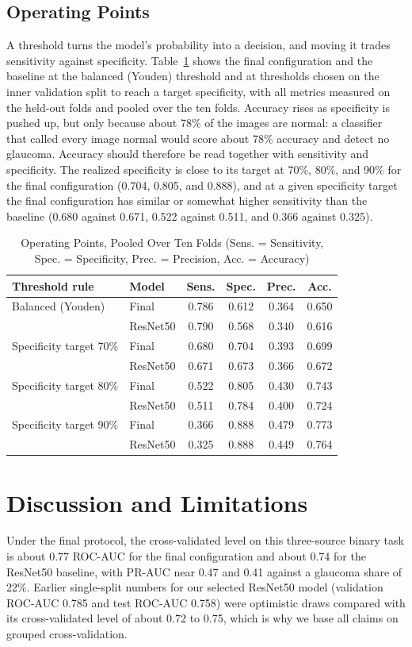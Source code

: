 \subsection{Operating Points}
A threshold turns the model's probability into a decision, and moving it trades sensitivity against specificity. Table~\ref{tab:op} shows the final configuration and the baseline at the balanced (Youden) threshold and at thresholds chosen on the inner validation split to reach a target specificity, with all metrics measured on the held-out folds and pooled over the ten folds. Accuracy rises as specificity is pushed up, but only because about 78\% of the images are normal: a classifier that called every image normal would score about 78\% accuracy and detect no glaucoma. Accuracy should therefore be read together with sensitivity and specificity. The realized specificity is close to its target at 70\%, 80\%, and 90\% for the final configuration (0.704, 0.805, and 0.888), and at a given specificity target the final configuration has similar or somewhat higher sensitivity than the baseline (0.680 against 0.671, 0.522 against 0.511, and 0.366 against 0.325).

\begin{table}[!t]
\caption{Operating Points, Pooled Over Ten Folds (Sens. = Sensitivity, Spec. = Specificity, Prec. = Precision, Acc. = Accuracy)}
\label{tab:op}
\centering
\footnotesize
\setlength{\tabcolsep}{3pt}
\begin{tabular}{llcccc}
\toprule
Threshold rule & Model & Sens. & Spec. & Prec. & Acc. \\
\midrule
Balanced (Youden) & Final & 0.786 & 0.612 & 0.364 & 0.650 \\
 & ResNet50 & 0.790 & 0.568 & 0.340 & 0.616 \\
Specificity target 70\% & Final & 0.680 & 0.704 & 0.393 & 0.699 \\
 & ResNet50 & 0.671 & 0.673 & 0.366 & 0.672 \\
Specificity target 80\% & Final & 0.522 & 0.805 & 0.430 & 0.743 \\
 & ResNet50 & 0.511 & 0.784 & 0.400 & 0.724 \\
Specificity target 90\% & Final & 0.366 & 0.888 & 0.479 & 0.773 \\
 & ResNet50 & 0.325 & 0.888 & 0.449 & 0.764 \\
\bottomrule
\end{tabular}
\end{table}

\section{Discussion and Limitations}
\label{sec:discussion}
Under the final protocol, the cross-validated level on this three-source binary task is about 0.77 ROC-AUC for the final configuration and about 0.74 for the ResNet50 baseline, with PR-AUC near 0.47 and 0.41 against a glaucoma share of 22\%. Earlier single-split numbers for our selected ResNet50 model (validation ROC-AUC 0.785 and test ROC-AUC 0.758) were optimistic draws compared with its cross-validated level of about 0.72 to 0.75, which is why we base all claims on grouped cross-validation.

